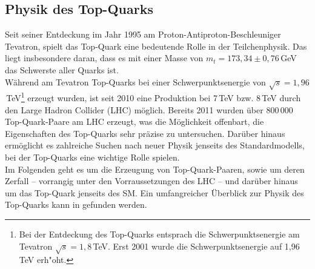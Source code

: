 \subsection{Physik des Top-Quarks}
\label{kaptop}
Seit seiner Entdeckung im Jahr 1995 am Proton-Antiproton-Beschleuniger Tevatron, spielt das Top-Quark eine bedeutende Rolle in der Teilchenphysik. Das liegt insbesondere daran,
dass es mit einer Masse von $m_{t}=173,34\pm 0,76$\,GeV \cite{ATLAS:2014wva} das Schwerste aller Quarks ist.\\
W\"ahrend am Tevatron Top-Quarks bei einer Schwerpunkts\-energie von $\sqrt{s}=1,96$\,TeV\footnote{Bei der Entdeckung des Top-Quarks entsprach die Schwerpunkts\-energie am Tevatron $\sqrt{s}=1,8$\,TeV.
Erst 2001 wurde die Schwerpunkts\-energie auf 1,96\,TeV erh"oht.} erzeugt wurden, ist seit 2010 eine Produktion bei 7\,TeV bzw. 8\,TeV durch den Large Hadron Collider (LHC) m\"oglich.
Bereits 2011 wurden über 800\,000 Top-Quark-Paare am LHC erzeugt, was die M\"oglichkeit offenbart, die Eigenschaften des Top-Quarks sehr pr\"azise zu untersuchen. Dar\"uber hinaus erm\"oglicht es zahlreiche Suchen nach neuer Physik jenseits des Standardmodells, bei der Top-Quarks eine wichtige Rolle spielen.\\
Im Folgenden geht es um die Erzeugung von Top-Quark-Paaren, sowie um deren Zerfall -- vorrangig unter den Vorraussetzungen des LHC -- und dar\"uber hinaus um das Top-Quark jenseits des SM. Ein umfangreicher \"Uberblick zur Physik des Top-Quarks kann in \cite{Bernreuther, Schilling} gefunden werden.


